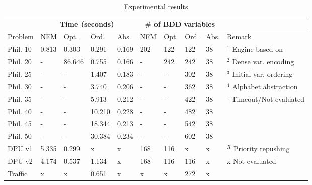 \documentclass[10pt, a4paper, onecolumn, conference, compsocconf]{IEEEtran}
\begin{document}
\begin{table}[htp]
\center
\begin{threeparttable}
\caption{Experimental results \label{tab:philo}}
\begin{small}
\begin{tabular}{|l|llll|llll|l|}\hline
 & \multicolumn{4}{c|}{Time (seconds)} &\multicolumn{4}{c|}{$\#$ of BDD variables} & \\ \hline
Problem & NFM\tnote{1} & Opt.\tnote{2} &  Ord.\tnote{3} & Abs.\tnote{4} & NFM & Opt. &  Ord. & Abs. & Remark \\ \hline
Phil. 10 &0.813 & 0.303  & 0.291 & 0.169    & 202 & 122 & 122 & 38 & $^1$ Engine based on~\cite{cheng:vissbip:2011} \\
Phil. 20 &-     & 86.646 & 0.755 & 0.166      & -   & 242 & 242 & 38 & $^2$ Dense var. encoding\\
Phil. 25 &-     & -      & 1.407 & 0.183    & -   & -   & 302 & 38 & $^3$ Initial var. ordering\\
Phil. 30 &-     & -      & 3.740  & 0.206    & -   & -   & 362 & 38 & $^4$ Alphabet abstraction\\
Phil. 35 &-     & -      & 5.913 & 0.212    & -   & -   & 422 & 38 & - Timeout/Not evaluated \\
Phil. 40 &-     & -      & 10.210 & 0.228    & -   & -   & 482 & 38 &\\
Phil. 45 &-     & -      & 18.344 & 0.213   & -   & -  & 542 & 38 &\\
Phil. 50 &-     & -      & 30.384 & 0.234   & -   & -  & 602 & 38& \\ \hline\hline
DPU v1  & 5.335   & 0.299  &  x  & x   & 168  & 116  & x & x & $^R$ Priority repushing\\
DPU v2  & 4.174   & 0.537   &  1.134\tnote{R}  & x   & 168  & 116  & 116\tnote{R} & x & x Not evaluated\\ \hline\hline
Traffic  & x  & x   &  0.651  & x   & x  & x & 272 & x &\\ \hline
\end{tabular}
\end{small}
\end{threeparttable}
\end{table}
\end{document}
